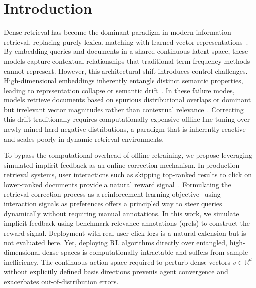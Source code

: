 \documentclass[sigconf]{acmart}
\begin{document}


\maketitle

\section{Introduction}

Dense retrieval has become the dominant paradigm in modern information retrieval, replacing purely lexical matching with learned vector representations~\cite{karpukhin2020, izacard2022}. By embedding queries and documents in a shared continuous latent space, these models capture contextual relationships that traditional term-frequency methods cannot represent. However, this architectural shift introduces control challenges. High-dimensional embeddings inherently entangle distinct semantic properties, leading to representation collapse or semantic drift~\cite{zhan2021}. In these failure modes, models retrieve documents based on spurious distributional overlaps or dominant but irrelevant vector magnitudes rather than contextual relevance~\cite{thakur2021}. Correcting this drift traditionally requires computationally expensive offline fine-tuning over newly mined hard-negative distributions, a paradigm that is inherently reactive and scales poorly in dynamic retrieval environments.

To bypass the computational overhead of offline retraining, we propose leveraging simulated implicit feedback as an online correction mechanism. In production retrieval systems, user interactions such as skipping top-ranked results to click on lower-ranked documents provide a natural reward signal~\cite{joachims2002, afsar2022}. Formulating the retrieval correction process as a reinforcement learning objective~\cite{christiano2017} using interaction signals as preferences offers a principled way to steer queries dynamically without requiring manual annotations. In this work, we simulate implicit feedback using benchmark relevance annotations (qrels) to construct the reward signal. Deployment with real user click logs is a natural extension but is not evaluated here. Yet, deploying RL algorithms directly over entangled, high-dimensional dense spaces is computationally intractable and suffers from sample inefficiency. The continuous action space required to perturb dense vectors $v \in \mathbb{R}^d$ without explicitly defined basis directions prevents agent convergence and exacerbates out-of-distribution errors.
\end{document}
